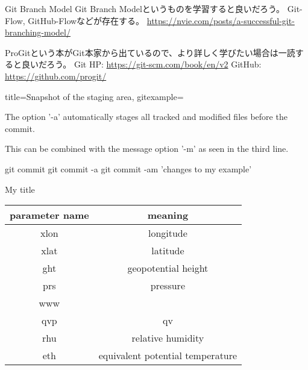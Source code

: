 \documentclass[10pt,a4j,openany,dvipdfmx]{jsarticle}
\begin{document}
\begin{skybox}{Git Branch Model}
Git Branch Modelというものを学習すると良いだろう。
Git-Flow, GitHub-Flowなどが存在する。
\tcblower
\url{https://nvie.com/posts/a-successful-git-branching-model/}
\end{skybox}

\begin{redbox}
ProGitという本がGit本家から出ているので、より詳しく学びたい場合は一読すると良いだろう。
\tcblower
Git HP: \url{https://git-scm.com/book/en/v2}
GitHub: \url{https://github.com/progit/}
\end{redbox}




\begin{tcblisting}{title={Snapshot of the staging area},
gitexample={The option '-a' automatically stages all tracked and modified
files before the commit.\par
This can be combined with the message option '-m'
as seen in the third line.}}
git commit
git commit -a
git commit -am 'changes to my example'
\end{tcblisting}


\begin{myfilebox}[colbacktitle=RoyalBlue]{My title}
\lipsum[2]
\end{myfilebox}


\begin{table}[H]
  \centering
  \begin{tabular}{|c|c|} \hline
      parameter name & meaning\\ \hline \hline
      xlon & longitude\\
      xlat & latitude\\
      ght  & geopotential height\\
      prs  & pressure\\
      www  & \\
      qvp  & qv\\
      rhu  & relative humidity\\ 
      eth  & equivalent potential temperature\\ \hline
  \end{tabular}
\end{table}


\end{document}
